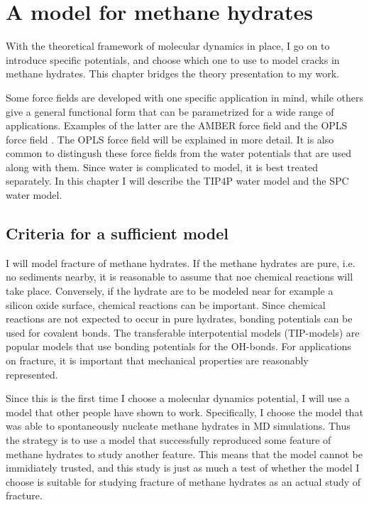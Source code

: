 \chapter{A model for methane hydrates}
\label{ch:models}
With the theoretical framework of molecular dynamics in place, I go on to introduce specific potentials, and choose which one to use to model cracks in methane hydrates. This chapter bridges the theory presentation to my work. 

Some force fields are developed with one specific application in mind, while others give a general functional form that can be parametrized for a wide range of applications. Examples of the latter are the AMBER force field \cite{Cornell1995} and the OPLS force field \cite{Jorgensen1988}. The OPLS force field will be explained in more detail. It is also common to distingush these force fields from the water potentials that are used along with them. Since water is complicated to model, it is best treated separately. In this chapter I will describe the TIP4P water model and the SPC water model.

\section{Criteria for a sufficient model}
I will model fracture of methane hydrates. If the methane hydrates are pure, i.e. no sediments nearby, it is reasonable to assume that noe chemical reactions will take place. Conversely, if the hydrate are to be modeled near for example a silicon oxide surface, chemical reactions can be important. Since chemical reactions are not expected to occur in pure hydrates, bonding potentials can be used for covalent bonds. The transferable interpotential models (TIP-models) are popular models that use bonding potentials for the OH-bonds. For applications on fracture, it is important that mechanical properties are reasonably represented. 

Since this is the first time I choose a molecular dynamics potential, I will use a model that other people have shown to work. Specifically, I choose the model that was able to spontaneously nucleate methane hydrates in MD simulations. Thus the strategy is to use a model that successfully reproduced some feature of methane hydrates to study another feature. This means that the model cannot be immidiately trusted, and this study is just as much a test of whether the model I choose is suitable for studying fracture of methane hydrates as an actual study of fracture.


